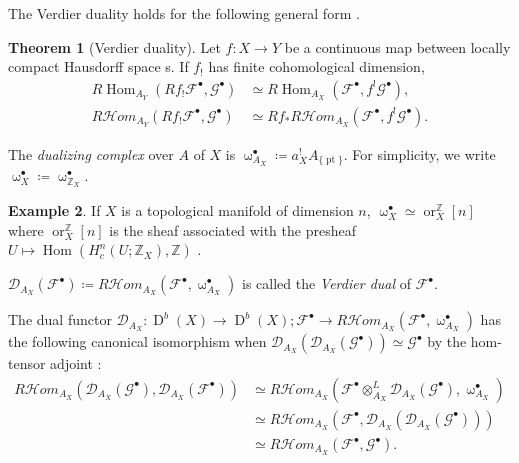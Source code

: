 \documentclass[a4paper,dvipdfmx,reqno,12pt]{amsart}
\theoremstyle{definition}
\newtheorem{theorem}{Theorem}[section]
\newtheorem{example}[theorem]{Example}
\newcommand{\deq}{\coloneqq}
\newcommand{\Z}{\mathbb{Z}}%
\newcommand{\mcal}[1]{\mathcal{#1}}%
\newcommand{\opn}[1]{\operatorname{#1}}
\numberwithin{equation}{section}
\begin{document}
The Verdier duality holds for the following general form
\cite[Proposition 3.1.10]{MR1299726}.


\begin{theorem}[{Verdier duality}]
Let $f\colon X\to Y$ be a continuous map between locally 
compact Hausdorff space s. If $f_!$ has finite cohomological
dimension, 
\begin{align}
R\opn{Hom}_{A_Y}(R f_!\mcal{F}^{\bullet},\mcal{G}^{\bullet})    & \simeq R\opn{Hom}_{A_X}(\mcal{F}^{\bullet},f^{!}\mcal{G}^{\bullet}),        \\
R \mcal{H}om_{A_Y}(R f_! \mcal{F}^{\bullet},\mcal{G}^{\bullet}) & \simeq Rf_* R\mcal{H}om_{A_X}(\mcal{F}^{\bullet},f^{!}\mcal{G}^{\bullet}).
\end{align}
\end{theorem}
The \emph{dualizing complex} over $A$ of $X$ is 
$\upomega_{A_X}^{\bullet}\deq a^{!}_{X}A_{\{\opn{pt}\}}$.
For simplicity, we write 
$\upomega_X^{\bullet}\deq 
\upomega_{\mathbb{Z}_X}^{\bullet}$.

\begin{example}
If $X$ is a topological manifold of dimension $n$, 
$\upomega^{\bullet}_{X}\simeq \opn{or}_{X}^{\Z}[n]$ 
where $\opn{or}_{X}^{\mathbb{Z}}[n]$ is the sheaf 
associated with the presheaf $U\mapsto 
\opn{Hom}(H^{n}_c(U;\mathbb{Z}_{X}),\mathbb{Z})$
\cite[Proposition 3.3.6]{MR1299726}.
\end{example}

$\mathcal{D}_{A_X}(\mathcal{F}^{\bullet})
\deq R\mathcal{H}om_{A_X}(\mathcal{F}^{\bullet},
\upomega_{A_X}^{\bullet})$ 
is called the  \emph{Verdier dual} of 
$\mathcal{F}^{\bullet}$.

The dual functor
$\mathcal{D}_{A_X}\colon \opn{D}^{b}(X)\to 
\opn{D}^{b}(X); \mathcal{F}^{\bullet} \to  R\mathcal{H}om_{A_X}(\mathcal{F}^{\bullet},
\upomega_{A_X}^{\bullet})$
has the following canonical isomorphism when 
$\mathcal{D}_{A_X}(\mathcal{D}_{A_X}(\mathcal{G}^{\bullet}))
\simeq \mathcal{G}^{\bullet}$ by the hom-tensor adjoint
\cite[Proposition 2.6.3]{MR1299726}:
\begin{align}
R\mathcal{H}om_{A_X}
(\mathcal{D}_{A_X}(\mathcal{G}^{\bullet}),
\mathcal{D}_{A_X}(\mathcal{F}^{\bullet})) 
& \simeq R\mathcal{H}om_{A_X}
(\mathcal{F}^{\bullet}\otimes^{L}_{A_X}
\mathcal{D}_{A_X}(\mathcal{G}^{\bullet}),
\upomega_{A_X}^{\bullet}) \\
& \simeq R\mathcal{H}om_{A_X}
(\mathcal{F}^{\bullet},
\mathcal{D}_{A_X}(\mathcal{D}_{A_X}(\mathcal{G}^{\bullet}))) \\
& \simeq R\mathcal{H}om_{A_X}
(\mathcal{F}^{\bullet},
\mathcal{G}^{\bullet}).
\end{align}
\end{document}
